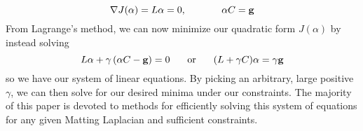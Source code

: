 \[\nabla J(\alpha)=L\alpha=0,\hspace{.5in}\alpha C=\textbf{g}\]
From Lagrange's method, we can now minimize our quadratic form $J(\alpha)$ by instead solving
\[L\alpha+\gamma\left(\alpha C-\textbf{g}\right) = 0
	\hspace{.2in}\text{ or }\hspace{.2in}
	(L+\gamma C)\alpha = \gamma \textbf{g}\]
so we have our system of linear equations. By picking an arbitrary, large positive $\gamma$, we can then solve for our desired minima under our constraints. The majority of this paper is devoted to methods for efficiently solving this system of equations for any given Matting Laplacian and sufficient constraints.